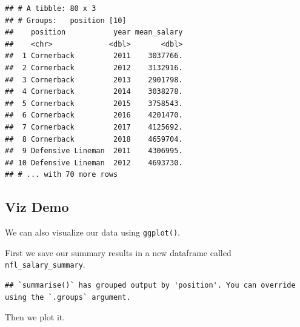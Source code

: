 \documentclass[
]{book}
\newenvironment{Shaded}{\begin{snugshade}}{\end{snugshade}}
\newcommand{\DataTypeTok}[1]{\textcolor[rgb]{0.13,0.29,0.53}{#1}}
\newcommand{\KeywordTok}[1]{\textcolor[rgb]{0.13,0.29,0.53}{\textbf{#1}}}
\newcommand{\NormalTok}[1]{#1}
\newcommand{\OperatorTok}[1]{\textcolor[rgb]{0.81,0.36,0.00}{\textbf{#1}}}
\newcommand{\StringTok}[1]{\textcolor[rgb]{0.31,0.60,0.02}{#1}}
\begin{document}
\begin{verbatim}
## # A tibble: 80 x 3
## # Groups:   position [10]
##    position           year mean_salary
##    <chr>             <dbl>       <dbl>
##  1 Cornerback         2011    3037766.
##  2 Cornerback         2012    3132916.
##  3 Cornerback         2013    2901798.
##  4 Cornerback         2014    3038278.
##  5 Cornerback         2015    3758543.
##  6 Cornerback         2016    4201470.
##  7 Cornerback         2017    4125692.
##  8 Cornerback         2018    4659704.
##  9 Defensive Lineman  2011    4306995.
## 10 Defensive Lineman  2012    4693730.
## # ... with 70 more rows
\end{verbatim}

\hypertarget{viz-demo}{%
\subsection{Viz Demo}\label{viz-demo}}

We can also visualize our data using \texttt{ggplot()}.

First we save our summary results in a new dataframe called \texttt{nfl\_salary\_summary}.

\begin{Shaded}
\end{Shaded}

\begin{verbatim}
## `summarise()` has grouped output by 'position'. You can override using the `.groups` argument.
\end{verbatim}

Then we plot it.

\begin{Shaded}
\end{Shaded}
\end{document}
